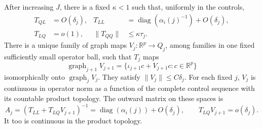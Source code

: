 \begin{proposition}
\label{n:prop-exact-graphs}
After increasing \(J\), there is a fixed \(\kappa<1\) such that, uniformly
in the controls,
\begin{equation}
 \begin{aligned}
 T_{QL}&=O(\delta_j),&
 T_{LL}&=\operatorname{diag}(\alpha_i(j)^{-1})+O(\delta_j),\\
 T_{LQ}&=o(1),&
 \|T_{QQ}\|&\leq\kappa\tau_j.
 \end{aligned}
 \label{n:eq-transfer-blocks}
\end{equation}
There is a unique family of graph maps
\(V_j:\mathbb R^p\to Q_j\), among families in one fixed sufficiently small
operator ball, such that \(T_j\) maps
\[
 \operatorname{graph}_{j+1}V_{j+1}
 =\{\iota_{j+1}c+V_{j+1}c:c\in\mathbb R^p\}
\]
isomorphically onto \(\operatorname{graph}_jV_j\).
They satisfy \(\|V_j\|\leq C\delta_j\).  For each fixed \(j\), \(V_j\) is
continuous in operator norm as a function of the complete control sequence
with its countable product topology.  The outward matrix on these spaces is
\begin{equation}
 A_j=(T_{LL}+T_{LQ}V_{j+1})^{-1}
     =\operatorname{diag}(\alpha_i(j))+O(\delta_j),
 \qquad T_{LQ}V_{j+1}=o(\delta_j).
 \label{n:eq-exact-outward}
\end{equation}
It too is continuous in the product topology.
\end{proposition}

